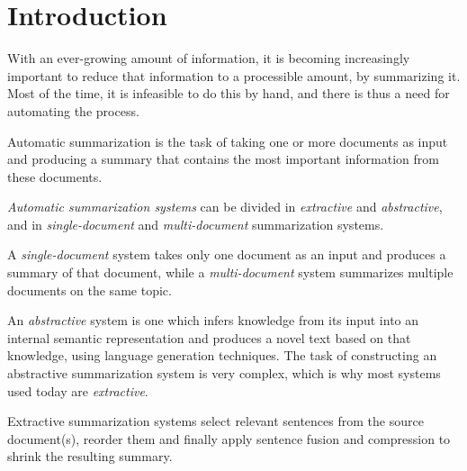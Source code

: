 \documentclass[a4paper,10pt]{scrartcl}
\theoremstyle{style}
\begin{document}
\newpage

\thispagestyle{empty}
\tableofcontents
\newpage

\setcounter{page}{1}		%
\newpage







\maketableofcontents

\section{Introduction}
With an ever-growing amount of information, it is becoming increasingly important to reduce that information to a processible amount, by summarizing it. Most of the time, it is infeasible to do this by hand, and there is thus a need for automating the process.

Automatic summarization is the task of taking one or more documents as input and producing a summary that contains the most important information from these documents.

\textit{Automatic summarization systems} can be divided in \textit{extractive} and \textit{abstractive}, and in \textit{single-document} and \textit{multi-document} summarization systems.

A \textit{single-document} system takes only one document as an input and produces a summary of that document, while a \textit{multi-document} system summarizes multiple documents on the same topic.

An \textit{abstractive} system is one which infers knowledge from its input into an internal semantic representation and produces a novel text based on that knowledge, using language generation techniques. The task of constructing an abstractive summarization system is very complex, which is why most systems used today are \textit{extractive}.

Extractive summarization systems select relevant sentences from the source document(s), reorder them and finally apply sentence fusion and compression to shrink the resulting summary.
\end{document}
